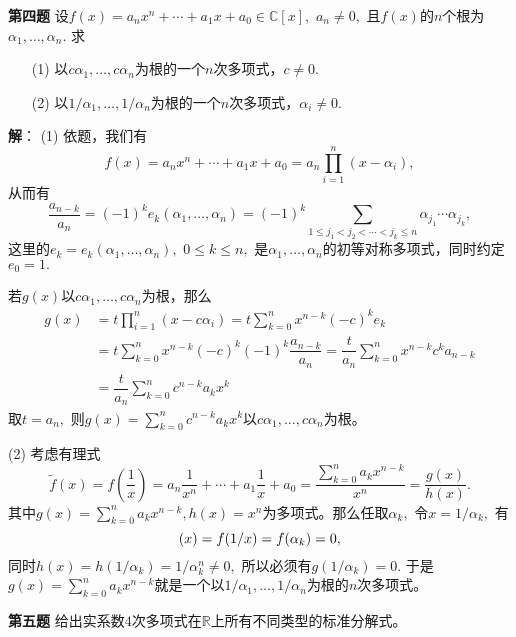 \newpageorvspace

{\bf 第四题} 设$f(x) = a_n x^n + \cdots + a_1 x + a_0 \in \mathbb{C}[x],$ $a_n \neq 0,$ 且$f(x)$的$n$个根为$\alpha_1, \ldots, \alpha_n.$ 求
\begin{itemize}
\item[(1)] 以$c\alpha_1, \ldots, c\alpha_n$为根的一个$n$次多项式，$c \neq 0.$
\item[(2)] 以$1/\alpha_1, \ldots, 1/\alpha_n$为根的一个$n$次多项式，$\alpha_i \neq 0.$
\end{itemize}

\ifIncludeAnswer

\newpageorvspace

{\bf 解}： (1) 依题，我们有
$$f(x) = a_n x^n + \cdots + a_1 x + a_0 = a_n \prod\limits_{i=1}^n (x - \alpha_i),$$
从而有
$$
\dfrac{a_{n-k}}{a_n} = (-1)^k e_k(\alpha_1, \ldots, \alpha_n) = (-1)^k \sum\limits_{1 \leqslant j_{1} < j_{2} < \cdots < j_{k} \leqslant n} \alpha_{j_{1}} \dotsm \alpha_{j_{k}},
$$
这里的$e_k = e_k(\alpha_1, \ldots, \alpha_n),$ $0\leqslant k \leqslant n,$ 是$\alpha_1, \ldots, \alpha_n$的初等对称多项式，同时约定$e_0 = 1.$

若$g(x)$以$c\alpha_1, \ldots, c\alpha_n$为根，那么
\begin{align*}
g(x) & = t \prod\limits_{i=1}^n (x - c\alpha_i) = t \sum\limits_{k=0}^n x^{n-k} (-c)^k e_k \\
& = t \sum\limits_{k=0}^n x^{n-k} (-c)^k (-1)^k \dfrac{a_{n-k}}{a_n} = \dfrac{t}{a_n} \sum\limits_{k=0}^n x^{n-k} c^k a_{n-k} \\
& = \dfrac{t}{a_n} \sum\limits_{k=0}^n c^{n-k} a_k x^k
\end{align*}
取$t = a_n,$ 则$g(x) = \sum\limits_{k=0}^n c^{n-k} a_k x^k$以$c\alpha_1, \ldots, c\alpha_n$为根。

(2) 考虑有理式
$$\tilde{f}(x) = f \left( \dfrac{1}{x} \right) = a_n \dfrac{1}{x^n} + \cdots + a_1 \dfrac{1}{x} + a_0 = \dfrac{\sum\limits_{k=0}^n a_k x^{n-k}}{x^n} = \dfrac{g(x)}{h(x)}.$$
其中$g(x) = \sum\limits_{k=0}^n a_k x^{n-k}, h(x) = x^n$为多项式。那么任取$\alpha_k,$ 令$x = 1/\alpha_k,$ 有
$$\title{f}(x) = f(1/x) = f(\alpha_k) = 0,$$
同时$h(x) = h(1/\alpha_k) = 1/\alpha_k^n \neq 0,$ 所以必须有$g(1/\alpha_k) = 0.$ 于是$g(x) = \sum\limits_{k=0}^n a_k x^{n-k}$就是一个以$1/\alpha_1, \ldots, 1/\alpha_n$为根的$n$次多项式。

\fi  %

\newpageorvspace

{\bf 第五题} 给出实系数$4$次多项式在$\mathbb{R}$上所有不同类型的标准分解式。

